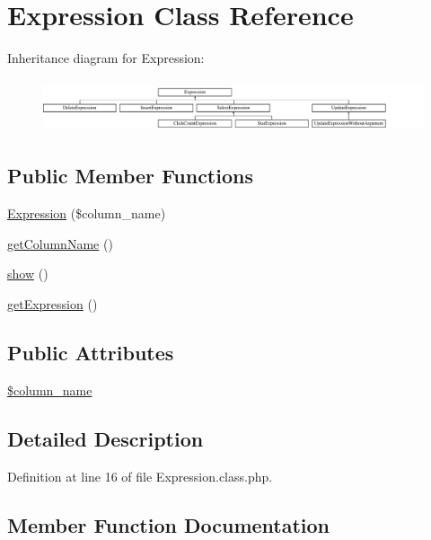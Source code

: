 \hypertarget{classExpression}{}\section{Expression Class Reference}
\label{classExpression}
Inheritance diagram for Expression\+:\begin{figure}[H]
\begin{center}
\leavevmode
\includegraphics[height=1.555556cm]{classExpression}
\end{center}
\end{figure}
\subsection*{Public Member Functions}
\begin{DoxyCompactItemize}
\item 
\hyperlink{classExpression_a059a95604c7c5251b6afc25203d4c417}{Expression} (\$column\+\_\+name)
\item 
\hyperlink{classExpression_a1822fc4ae1532c280ed017265aff00d7}{get\+Column\+Name} ()
\item 
\hyperlink{classExpression_abe2ca73915eb11fbfbc67d14b610bace}{show} ()
\item 
\hyperlink{classExpression_aac1c43a04af3c8208e48e4a67283ff81}{get\+Expression} ()
\end{DoxyCompactItemize}
\subsection*{Public Attributes}
\begin{DoxyCompactItemize}
\item 
\hyperlink{classExpression_aa097fe1e0f08ca2a83341acc172811dd}{\$column\+\_\+name}
\end{DoxyCompactItemize}


\subsection{Detailed Description}


Definition at line 16 of file Expression.\+class.\+php.



\subsection{Member Function Documentation}
\mbox{\label{classExpression_a059a95604c7c5251b6afc25203d4c417}} 

